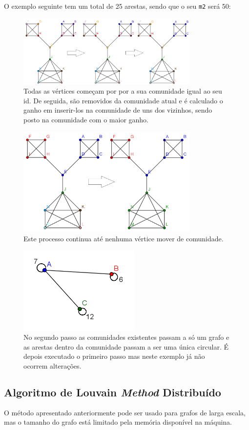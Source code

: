 O exemplo seguinte tem um total de 25 arestas, sendo que o seu \verb|m2| será 50:
\begin{figure}
\centering
\includegraphics[width=90mm]{graphf1}
\caption*{Todas as vértices começam por por a sua comunidade igual ao seu id. De seguida, são removidos da comunidade atual e é calculado o ganho em inserir-los na comunidade de uns dos vizinhos, sendo posto na comunidade com o maior ganho.}
\end{figure}
\begin{figure}
\centering
\includegraphics[width=90mm]{graphf2}
\caption*{Este processo continua até nenhuma vértice mover de comunidade.}
\end{figure}
\begin{figure}
\centering
\includegraphics[width=60mm]{graphf3}
\caption*{No segundo passo as comunidades existentes passam a só um grafo e as arestas dentro da comunidade passam a ser uma única circular. É depois executado o primeiro passo mas neste exemplo já não ocorrem alterações.}
\end{figure}


\newpage
\subsection{Algoritmo de Louvain \textit{Method} Distribuído}
O método apresentado anteriormente pode ser usado para grafos de larga escala, mas o tamanho do grafo está limitado pela memória disponível na máquina.

